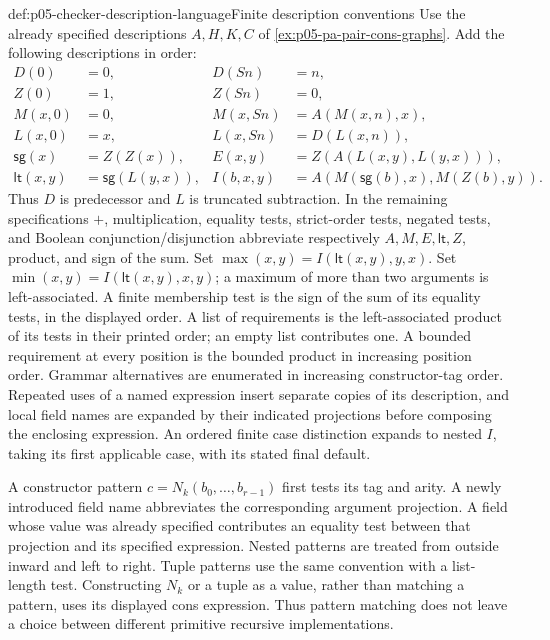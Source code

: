 \begin{hbdefinition}{def:p05-checker-description-language}{Finite description conventions}
Use the already specified descriptions \(A,H,K,C\) of
\cref{ex:p05-pa-pair-cons-graphs}.  Add the following descriptions in order:
\[
\begin{aligned}
 D(0)&=0,&D(Sn)&=n,\\
 Z(0)&=1,&Z(Sn)&=0,\\
 M(x,0)&=0,&M(x,Sn)&=A(M(x,n),x),\\
 L(x,0)&=x,&L(x,Sn)&=D(L(x,n)),\\
 \mathsf{sg}(x)&=Z(Z(x)),&
 E(x,y)&=Z(A(L(x,y),L(y,x))),\\
 \mathsf{lt}(x,y)&=\mathsf{sg}(L(y,x)),&
 I(b,x,y)&=A(M(\mathsf{sg}(b),x),M(Z(b),y)).
\end{aligned}
\]
Thus \(D\) is predecessor and \(L\) is truncated subtraction.  In the
remaining specifications \(+\), multiplication, equality tests, strict-order
tests, negated tests, and Boolean conjunction/disjunction abbreviate
respectively \(A,M,E,\mathsf{lt},Z\), product, and sign of the sum.
Set \(\max(x,y)=I(\mathsf{lt}(x,y),y,x)\).
Set \(\min(x,y)=I(\mathsf{lt}(x,y),x,y)\); a maximum of more than two
arguments is left-associated.  A finite membership test is the sign of the
sum of its equality tests, in the displayed order.  A list of requirements
is the left-associated product of its tests in their printed order; an empty
list contributes one.  A bounded requirement at every position is the bounded
product in increasing position order.  Grammar alternatives are enumerated
in increasing constructor-tag order.  Repeated uses of a named expression
insert separate copies of its description, and local field names are expanded
by their indicated projections before composing the enclosing expression.
An ordered finite case distinction expands to nested \(I\), taking its first
applicable case, with its stated final default.

A constructor pattern \(c=N_k(b_0,\ldots,b_{r-1})\) first tests its tag
and arity.  A newly introduced field name abbreviates the corresponding
argument projection.  A field whose value was already specified contributes
an equality test between that projection and its specified expression.
Nested patterns are treated from outside inward and left to right.  Tuple
patterns use the same convention with a list-length test.  Constructing
\(N_k\) or a tuple as a value, rather than matching a pattern, uses its
displayed cons expression.  Thus pattern matching does not leave a choice
between different primitive recursive implementations.


\end{hbdefinition}
